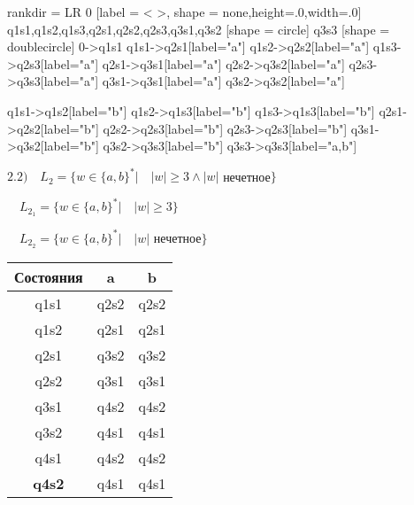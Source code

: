 \documentclass{article}
\begin{document}
\begin{center}
 {
    rankdir = LR
    0 [label = < >, shape = none,height=.0,width=.0]
    q1s1,q1s2,q1s3,q2s1,q2s2,q2s3,q3s1,q3s2 [shape = circle]
    q3s3 [shape = doublecircle]
    0->q1s1
    q1s1->q2s1[label="a"]
    q1s2->q2s2[label="a"]
    q1s3->q2s3[label="a"]
    q2s1->q3s1[label="a"]
    q2s2->q3s2[label="a"]
    q2s3->q3s3[label="a"]
    q3s1->q3s1[label="a"]
    q3s2->q3s2[label="a"]
    
    q1s1->q1s2[label="b"]
    q1s2->q1s3[label="b"]
    q1s3->q1s3[label="b"]
    q2s1->q2s2[label="b"]
    q2s2->q2s3[label="b"]
    q2s3->q2s3[label="b"]
    q3s1->q3s2[label="b"]
    q3s2->q3s3[label="b"]
    q3s3->q3s3[label="a,b"]
}



$2.2) \quad L_2 = \{w \in \{ a,b \}^*  | \quad |w| \geq 3 \wedge |w|$ нечетное$\}$ \newline


$\quad L_2_1 = \{w \in \{ a,b \}^*  | \quad |w| \geq 3\}$ \newline
{}
            
            
$\quad L_2_2 = \{w \in \{ a,b \}^*  | \quad |w|$ нечетное$\}$   \newline         
{}    

\begin{tabular}{|c|c|c|}
            \hline
            Состояния & a & b \\
            \hline
            q1s1 & q2s2 & q2s2\\
            q1s2 & q2s1 & q2s1\\
            q2s1 & q3s2 & q3s2\\
            q2s2 & q3s1 & q3s1\\
            q3s1 & q4s2 & q4s2\\
            q3s2 & q4s1 & q4s1\\
            q4s1 & q4s2 & q4s2\\
            \textbf{q4s2} & q4s1 & q4s1\\
            \hline
\end{tabular}
\newline
\end{center}
\end{document}
